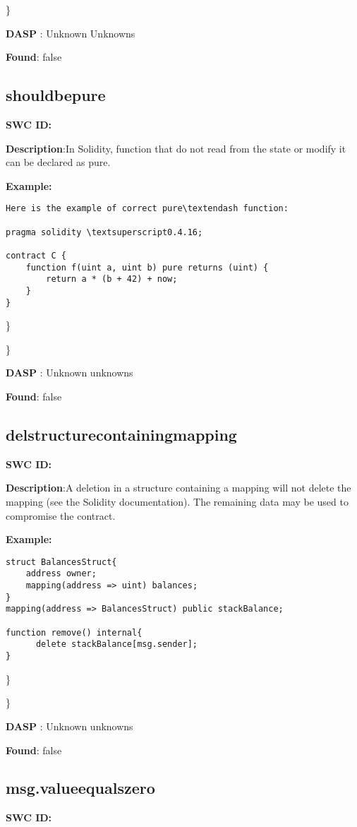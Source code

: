 \documentclass{article}
\begin{document}
\} 

\textbf{DASP} : Unknown Unknowns

\textbf{Found}: false

\subsection{should\textunderscore be\textunderscore pure} 
\textbf{SWC \textunderscore ID:} 

\textbf{Description}:In Solidity, function that do not read from the state or modify it can be declared as pure.


\textbf{Example:} 
\begin{verbatim}
Here is the example of correct pure\textendash function:

pragma solidity \textsuperscript0.4.16;

contract C {
    function f(uint a, uint b) pure returns (uint) {
        return a * (b + 42) + now;
    }
}

\end{verbatim}\} 

\} 

\textbf{DASP} : Unknown unknowns

\textbf{Found}: false

\subsection{del\textunderscore structure\textunderscore containing\textunderscore mapping} 
\textbf{SWC \textunderscore ID:} 

\textbf{Description}:A deletion in a structure containing a mapping will not delete the mapping (see the Solidity documentation). The remaining data may be used to compromise the contract.


\textbf{Example:} 
\begin{verbatim}
struct BalancesStruct{
    address owner;
    mapping(address => uint) balances;
}
mapping(address => BalancesStruct) public stackBalance;

function remove() internal{
      delete stackBalance[msg.sender];
}

\end{verbatim}\} 

\} 

\textbf{DASP} : Unknown unknowns

\textbf{Found}: false

\subsection{msg.value\textunderscore equals\textunderscore zero} 
\textbf{SWC \textunderscore ID:} 
\end{document}
